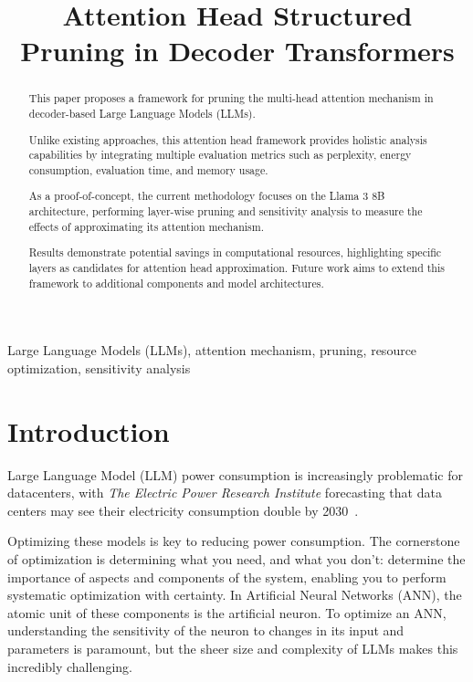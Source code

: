 \documentclass[conference]{IEEEtran}
\begin{document}
    \title{Attention Head Structured Pruning in Decoder Transformers}

    \author{
    }

    \maketitle

    \begin{abstract}
        This paper proposes a framework for pruning the multi-head attention mechanism in decoder-based Large Language Models (LLMs).

        Unlike existing approaches, this attention head framework provides holistic analysis capabilities by integrating multiple evaluation metrics such as perplexity, energy consumption, evaluation time, and memory usage.

        As a proof-of-concept, the current methodology focuses on the Llama 3 8B architecture, performing layer-wise pruning and sensitivity analysis to measure the effects of approximating its attention mechanism.

        Results demonstrate potential savings in computational resources, highlighting specific layers as candidates for attention head approximation.
        Future work aims to extend this framework to additional components and model architectures.
    \end{abstract}

    \begin{IEEEkeywords}
        Large Language Models (LLMs), attention mechanism, pruning, resource optimization, sensitivity analysis
    \end{IEEEkeywords}

    \section{Introduction}
    Large Language Model (LLM) power consumption is increasingly problematic for datacenters, with \textit{The Electric Power
    Research Institute} forecasting that data centers may see their electricity consumption double by
    2030~\cite{kindig2024}.

    Optimizing these models is key to reducing power consumption.
    The cornerstone of optimization is determining what you need, and what you don't: determine the importance of
    aspects and components of the system, enabling you to perform systematic optimization with certainty.
    In Artificial Neural Networks (ANN), the atomic unit of these components is the artificial neuron.
    To optimize an ANN, understanding the sensitivity of the neuron to changes in its input and parameters is paramount,
    but the sheer size and complexity of LLMs makes this incredibly challenging.
\end{document}
